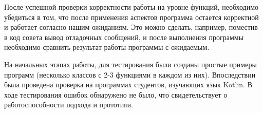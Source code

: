\documentclass[conference]{IEEEtran}
\begin{document}
После успешной проверки корректности работы на уровне функций, необходимо
убедиться в том, что после применения аспектов программа остается корректной
и работает согласно нашим ожиданиям.
Это можно сделать, например, поместив в код совета вывод отладочных сообщений,
и после выполнения программы необходимо сравнить результат работы программы с 
ожидаемым.



На начальных этапах работы, для тестирования были созданы простые примеры 
программ (несколько классов с 2-3 функциями в каждом из них).
Впоследствии была проведена проверка на программах студентов, изучающих язык
Kotlin.
В ходе тестирования ошибок обнаружено не было, что свидетельствует о
работоспособности подхода и прототипа.


\end{document}
